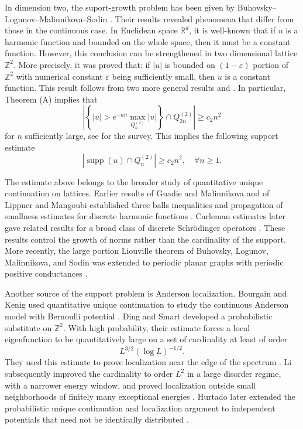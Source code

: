 \documentclass[11pt,reqno]{amsart}
\newcommand\R{\ensuremath{\mathbb{R}}}
\newcommand\Z{\ensuremath{\mathbb{Z}}}
\newcommand{\supp}{\operatorname{supp}}
\theoremstyle{definition}
\theoremstyle{plain}
\numberwithin{equation}{section}
\begin{document}
In dimension two, the suport-growth problem has been given by Buhovsky--Logunov--Malinnikova--Sodin \cite{BLMS}. Their results revealed phenomena that differ from those in the continuous case. In Euclidean space $\R^d$, it is well-known that if $u$ is a harmonic function and bounded on the whole space, then it must be a constant function. However, this conclusion can be strengthened in two dimensional lattice $\Z^2$. More precisely, it was proved that: if $|u|$ is bounded on $(1-\varepsilon)$ portion of $\Z^2$ with numerical constant $\varepsilon$ being sufficiently small, then $u$ is a constant function.  This result follows from two more general results \cite[Theorem (A)]{BLMS} and \cite[Theorem (B)]{BLMS}.
In particular,
Theorem (A) implies that 
\begin{equation*}
    \left| \left\lbrace|u|>e^{-an}\max_{Q_n^{(2)}} |u |\right\rbrace\cap Q_{2n}^{(2)}\right|\ge c_2n^2
\end{equation*}
for $n$ sufficiently large, see \cite{uniqueness2023malinnikova} for the survey. This implies the following support estimate
\begin{equation*}
    \left|\supp(u)\cap Q_n^{(2)} \right|\ge c_2 n^2,\quad \forall n\ge 1.
\end{equation*}


The estimate above belongs to the broader study of quantitative unique
continuation on lattices. Earlier results of Guadie and Malinnikova and of
Lippner and Mangoubi established three balls inequalities and propagation
of smallness estimates for discrete harmonic functions
\cite{GuadieMalinnikova2014,LippnerMangoubi2015}. Carleman estimates later
gave related results for a broad class of discrete Schr\"odinger
operators \cite{FernandezBertolinEtAl2021}. These results control the
growth of norms rather than the cardinality of the support. More recently,
the large portion Liouville theorem of
Buhovsky, Logunov, Malinnikova, and Sodin was extended to periodic planar
graphs with periodic positive conductances
\cite{BouRabeeCoopermanGanguly2025}.

Another source of the support problem is Anderson localization.
Bourgain and Kenig used quantitative unique continuation to study the
continuous Anderson model with Bernoulli potential
\cite{BourgainKenig2005}. Ding and Smart developed a probabilistic
substitute on $\Z^2$. With high probability, their estimate forces a
local eigenfunction to be quantitatively large on a set of cardinality
at least of order
\begin{equation*}
    L^{3/2}(\log L)^{-1/2}.
\end{equation*}
They used this estimate to prove localization near the edge of the
spectrum \cite{DingSmart2020}. Li subsequently improved the cardinality
to order $L^2$ in a large disorder regime, with a narrower energy window,
and proved localization outside small neighborhoods of finitely many
exceptional energies \cite{LiLargeDisorder2022}. Hurtado later extended
the probabilistic unique continuation and localization argument to
independent potentials that need not be identically distributed
\cite{Hurtado2026}.
\end{document}
